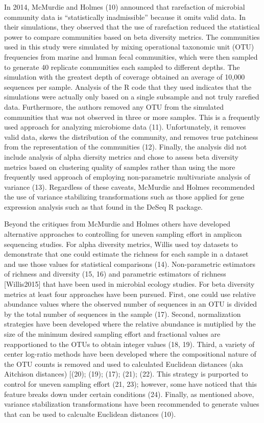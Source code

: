 \documentclass[
]{article}
\begin{document}
In 2014, McMurdie and Holmes (10) announced that rarefaction of
microbial community data is ``statistically inadmissible'' because it
omits valid data. In their simulations, they observed that the use of
rarefaction reduced the statistical power to compare communities based
on beta diversity metrics. The communities used in this study were
simulated by mixing operational taxonomic unit (OTU) frequencies from
marine and human fecal communities, which were then sampled to generate
40 replicate communities each sampled to different depths. The
simulation with the greatest depth of coverage obtained an average of
10,000 sequences per sample. Analysis of the R code that they used
indicates that the simulations were actually only based on a single
subsample and not truly rarefied data. Furthermore, the authors removed
any OTU from the simulated communities that was not observed in three or
more samples. This is a frequently used approach for analyzing
microbiome data (11). Unfortunately, it removes valid data, skews the
distribution of the community, and removes true patchiness from the
representation of the communities (12). Finally, the analysis did not
include analysis of alpha diersity metrics and chose to assess beta
diversity metrics based on clustering quality of samples rather than
using the more frequently used approach of employing non-parametric
multivariate analysis of variance (13). Regardless of these caveats,
McMurdie and Holmes recommended the use of variance stabilizing
transformations such as those applied for gene expression analysis such
as that found in the DeSeq R package.

Beyond the critiques from McMurdie and Holmes others have developed
alternative approaches to controlling for uneven sampling effort in
amplicon sequencing studies. For alpha diversity metrics, Willis used
toy datasets to demonstrate that one could estimate the richness for
each sample in a dataset and use those values for statistical
comparisons (14). Non-parametric estimators of richness and diversity
(15, 16) and parametric estimators of richness {[}Willis2015{]} that
have been used in microbial ecology studies. For beta diversity metrics
at least four approaches have been pursued. First, one could use
relative abundance values where the observed number of sequences in an
OTU is divided by the total number of sequences in the sample (17).
Second, normalization strategies have been developed where the relative
abundance is mutiplied by the size of the minimum desired sampling
effort and fractional values are reapportioned to the OTUs to obtain
integer values (18, 19). Third, a variety of center log-ratio methods
have been developed where the compositional nature of the OTU counts is
removed and used to calculated Euclidean distances (aka Aitchison
distances) {[}(20); (19); (17); (21); (22). This strategy is purported
to control for uneven sampling effort (21, 23); however, some have
noticed that this feature breaks down under certain conditions (24).
Finally, as mentioned above, variance stabilization transformations have
been recommended to generate values that can be used to calcualte
Euclidean distances (10).
\end{document}
